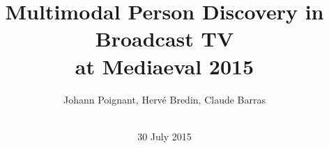 \documentclass{acm_proc_article-me}
\begin{document}
%

\title{
Multimodal Person Discovery in Broadcast TV \\ 
at Mediaeval 2015
}
%
%
%
%
%


\author{
%
%
\alignauthor
Johann Poignant, Herv\'e Bredin, Claude Barras \\
\\
}
\date{30 July 2015}
\end{document}
